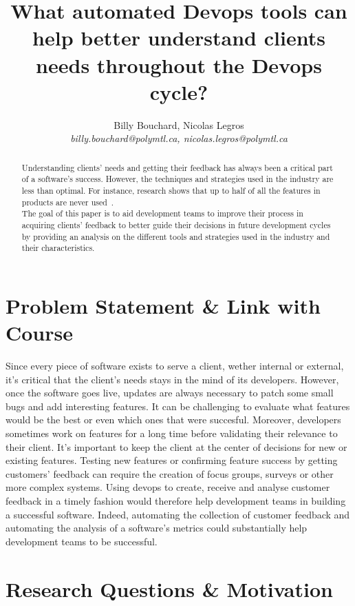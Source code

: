 \documentclass[10pt, conference]{IEEEtran}
\title{What automated Devops tools can help better understand clients needs 
  throughout the Devops cycle?}
\author{Billy Bouchard, Nicolas Legros    \\
    \emph{billy.bouchard@polymtl.ca, nicolas.legros@polymtl.ca}}
\begin{document}
\maketitle

\begin{abstract}
Understanding clients' needs and getting their feedback has always been 
a critical part of a software's success. However, the techniques and strategies
used in the industry are less than optimal. For instance, 
research shows that up to half of all the features in products are never used~\cite{olsson-helena-15}.\\
The goal of this paper is to aid development teams to improve their process 
in acquiring clients' feedback to better guide their decisions in future development
cycles by providing an analysis on the different tools and strategies used 
in the industry and their characteristics.
\end{abstract}

\section{Problem Statement \& Link with Course}
\label{sec:statement}

Since every piece of software exists to serve a client, wether internal or external,
it's critical that the client's needs stays in the mind of its developers.
However, once the software goes live, updates are always necessary to patch 
some small bugs and add interesting features.
It can be challenging to evaluate what features would be the best or even 
which ones that were succesful.
Moreover, developers sometimes work on features for a long time before 
validating their relevance to their client. It's important to keep the client 
at the center of decisions for new or existing features.
Testing new features or confirming feature success 
by getting customers' feedback can require the creation of focus groups, 
surveys or other more complex systems.
Using devops to create, receive and analyse customer feedback in a timely 
fashion would therefore help development teams in building a successful software.
Indeed, automating the collection of customer feedback and automating the analysis of 
a software's metrics could substantially help development teams to be successful.

\section{Research Questions \& Motivation}
\label{sec:research-idea}
\end{document}

